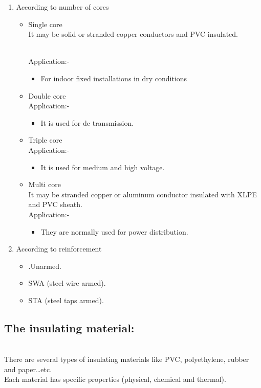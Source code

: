 \documentclass[12pt,fleqn]{book} %
\begin{document}
\begin{enumerate}
\begin{itemize}
\begin{enumerate}
    \end{enumerate}
    
\end{itemize}
    
    \item According to number of cores
    \begin{itemize}
    \item Single core
    \\ It may be solid or stranded copper conductors and   
PVC insulated.

\\ Application:-
\begin{itemize}
\item For indoor fixed installations in dry
conditions
 \end{itemize}
    \item Double core
    \\Application:-
    \begin{itemize}
\item It is used for dc transmission.
 \end{itemize}
    \item Triple core
      \\Application:-
    \begin{itemize}
\item It is used for medium and high voltage.
 \end{itemize}
    \item Multi core
    \\It may be stranded copper or aluminum
conductor insulated with XLPE and PVC
sheath.
    \\Application:-
    \begin{itemize}
\item They are normally used for
power distribution.
 \end{itemize}
    \end{itemize}
    \item According to reinforcement
    \begin{itemize}
\item .Unarmed.
\item SWA (steel wire armed).
\item STA (steel taps armed).
 \end{itemize}
    \end{enumerate}
    \subsection{ The insulating material:}
  \\ There are several types of insulating materials like PVC, polyethylene, rubber and paper…etc.
  \\ Each material has specific properties (physical, chemical and thermal).
  
\end{document}
